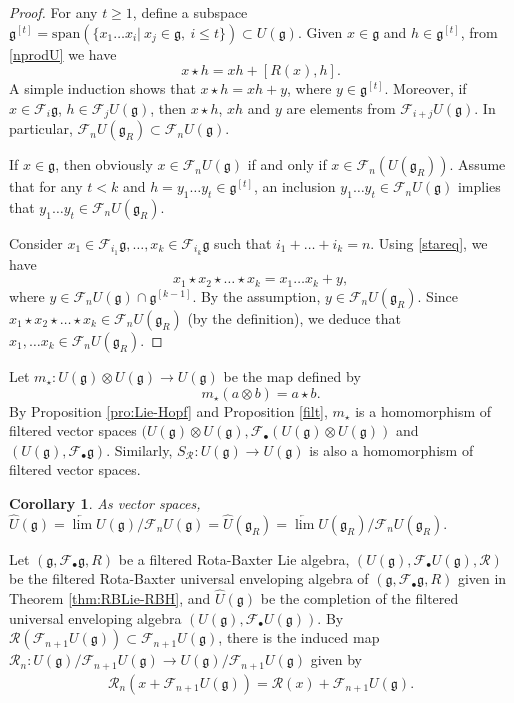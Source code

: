 \documentclass[12pt]{amsart}
\newtheorem{cor}[thm]{Corollary}
\theoremstyle{definition}   %
\newcommand{\g}{\mathfrak g}
\newcommand{\huaR}{\mathcal{R}}
\newcommand{\huaF}{\mathcal{F}}
\begin{document}
\begin{proof}
    For any $t\geq 1$, define a subspace $\g^{[t]}=\mathrm{span}\left(\{x_1\ldots x_i|\ x_j\in \g,\ i\leq t\}\right)\subset U(\g)$.
Given $x\in \g$ and $h\in \g^{[t]}$, from \eqref{nprodU} we have
    \begin{equation}\label{stareq}
    x\star h=xh+[R(x),h].
    \end{equation}
      A simple induction shows that $x\star h=xh+y$, where {$y\in \g^{[t]}$}. Moreover, if $x\in \huaF_i\g$, $h\in \huaF_jU(\g)$, then $x\star h$, $xh$ and $y$ are elements from $\huaF_{i+j}U(\g)$. In particular, $\huaF_nU(\g_R)\subset \huaF_nU(\g)$.

   If $x\in \g$, then obviously $x\in\huaF_nU(\g)$ if and only if $x\in \huaF_n(U(\g_R))$.  Assume that for any $t<k$ and $h=y_1\ldots y_t\in \g^{[t]}$, an inclusion $y_1\ldots y_t\in \huaF_nU(\g)$ implies that  $y_1\ldots y_t\in \huaF_nU(\g_R)$.

  Consider $x_1\in \huaF_{i_1}\g,\ldots,x_k\in \huaF_{i_k}\g$ such that $i_1+\ldots +i_k=n$. Using \eqref{stareq}, we have
    $$
    x_1\star x_2\star\ldots \star x_k=x_1\ldots x_k+y,
    $$
where $y\in \huaF_n U(\g)\cap \g^{[k-1]}$. By the assumption, $y\in \huaF_nU(\g_R)$. Since  $x_1\star x_2\star\ldots\star x_k\in \huaF_nU(\g_R)$ (by the definition), we deduce that $x_1,\ldots x_k\in \huaF_nU(\g_R)$.
\end{proof}


Let $m_{\star}: U(\g)\otimes U(\g)\rightarrow U(\g)$ be the map defined by
$$
m_{\star}(a\otimes b)=a\star b.
$$
By Proposition \ref{pro:Lie-Hopf} and Proposition \ref{filt}, $m_{\star}$ is a homomorphism of filtered vector spaces $(U(\g)\otimes U(\g),\huaF_{\bullet} (U(\g)\otimes U(\g))$ and $(U(\g),\huaF_{\bullet}\g)$. Similarly, $S_{\huaR}:U(\g)\rightarrow U(\g)$ is also a homomorphism of filtered vector spaces.

\begin{cor}\label{corfilt}
As vector spaces,
 $\widehat{U}(\g)=\underleftarrow{\lim}U(\g)/\huaF_n U(\g)=\widehat{U}(\g_R)=\underleftarrow{\lim}U(\g_R)/\huaF_n U(\g_R).$
\end{cor}



Let $(\g,\huaF_{\bullet}\g,R)$ be a filtered Rota-Baxter Lie algebra, $(U(\g),\huaF_{\bullet}U(\g),\huaR)$ be the filtered Rota-Baxter universal enveloping algebra of $(\g,\huaF_{\bullet}\g,R)$ given in Theorem \ref{thm:RBLie-RBH}, and $\widehat U(\g)$ be the completion of the filtered universal enveloping algebra $(U(\g),\huaF_{\bullet} U(\g))$.
By $\huaR(\huaF_{n+1} U(\mathfrak g))\subset \huaF_{n+1} U(\mathfrak g)$, there is the induced map $\huaR_n: U(\mathfrak g)/\huaF_{n+1}U(\mathfrak g)\rightarrow U(\mathfrak g)/\huaF_{n+1}U(\mathfrak g)$ given by
\begin{eqnarray}\label{comp-RB}
\huaR_n(x+\huaF_{n+1} U(\mathfrak g))=\huaR(x)+\huaF_{n+1} U(\mathfrak g).
\end{eqnarray}
\end{document}
